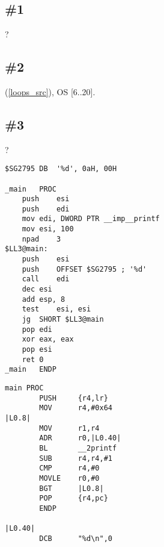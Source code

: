 ﻿\section{\Exercises}

\subsection{\Exercise \#1}

 \LOOP {}?

\subsection{\Exercise \#2}

(\ref{loops_src}), 
 \ac{OS}
 [6..20].

\subsection{\Exercise \#3}
\label{exercise_loops_3}

?

\begin{lstlisting}[caption=MSVC 2010 /Ox]
$SG2795	DB	'%d', 0aH, 00H

_main	PROC
	push	esi
	push	edi
	mov	edi, DWORD PTR __imp__printf
	mov	esi, 100
	npad	3
$LL3@main:
	push	esi
	push	OFFSET $SG2795 ; '%d'
	call	edi
	dec	esi
	add	esp, 8
	test	esi, esi
	jg	SHORT $LL3@main
	pop	edi
	xor	eax, eax
	pop	esi
	ret	0
_main	ENDP
\end{lstlisting}

\begin{lstlisting}[caption=Keil 5.03 (\ARMMode)]
main PROC
        PUSH     {r4,lr}
        MOV      r4,#0x64
|L0.8|
        MOV      r1,r4
        ADR      r0,|L0.40|
        BL       __2printf
        SUB      r4,r4,#1
        CMP      r4,#0
        MOVLE    r0,#0
        BGT      |L0.8|
        POP      {r4,pc}
        ENDP

|L0.40|
        DCB      "%d\n",0
\end{lstlisting}

